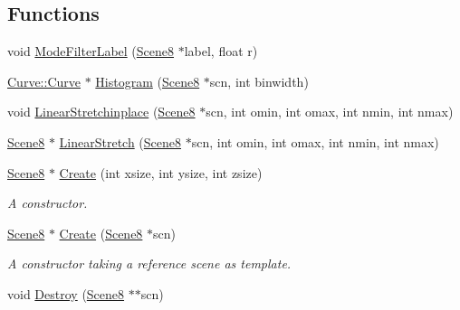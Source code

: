 \subsection*{Functions}
\begin{DoxyCompactItemize}
\item 
void \hyperlink{namespacegft_1_1Scene8_a7a9f16593eae85c0359704737ce04c5e}{Mode\-Filter\-Label} (\hyperlink{namespacegft_1_1Scene8_a78f9a172f8a505f9577adac7f85bc009}{Scene8} $\ast$label, float r)
\item 
\hyperlink{namespacegft_1_1Curve_acc891f63f04c17f7b2cafe7ed9ecffdb}{Curve\-::\-Curve} $\ast$ \hyperlink{namespacegft_1_1Scene8_a58ff59f9a9a8202a8734d1265e88c295}{Histogram} (\hyperlink{namespacegft_1_1Scene8_a78f9a172f8a505f9577adac7f85bc009}{Scene8} $\ast$scn, int binwidth)
\item 
void \hyperlink{namespacegft_1_1Scene8_aa41ca7bdcb6bec2db7517ba9fea728a6}{Linear\-Stretchinplace} (\hyperlink{namespacegft_1_1Scene8_a78f9a172f8a505f9577adac7f85bc009}{Scene8} $\ast$scn, int omin, int omax, int nmin, int nmax)
\item 
\hyperlink{namespacegft_1_1Scene8_a78f9a172f8a505f9577adac7f85bc009}{Scene8} $\ast$ \hyperlink{namespacegft_1_1Scene8_abbd2800999abad35c61eab03ea0054fa}{Linear\-Stretch} (\hyperlink{namespacegft_1_1Scene8_a78f9a172f8a505f9577adac7f85bc009}{Scene8} $\ast$scn, int omin, int omax, int nmin, int nmax)
\item 
\hyperlink{namespacegft_1_1Scene8_a78f9a172f8a505f9577adac7f85bc009}{Scene8} $\ast$ \hyperlink{namespacegft_1_1Scene8_a476604da641bb3190a1768767d153e6b}{Create} (int xsize, int ysize, int zsize)
\begin{DoxyCompactList}\small\item\em A constructor. \end{DoxyCompactList}\item 
\hyperlink{namespacegft_1_1Scene8_a78f9a172f8a505f9577adac7f85bc009}{Scene8} $\ast$ \hyperlink{namespacegft_1_1Scene8_ac03e5b57f01d6c2e4b531946f19fcd04}{Create} (\hyperlink{namespacegft_1_1Scene8_a78f9a172f8a505f9577adac7f85bc009}{Scene8} $\ast$scn)
\begin{DoxyCompactList}\small\item\em A constructor taking a reference scene as template. \end{DoxyCompactList}\item 
void \hyperlink{namespacegft_1_1Scene8_a1ed3612c02f519a006258e71a54be29e}{Destroy} (\hyperlink{namespacegft_1_1Scene8_a78f9a172f8a505f9577adac7f85bc009}{Scene8} $\ast$$\ast$scn)
$$
\end{DoxyCompactItemize}
